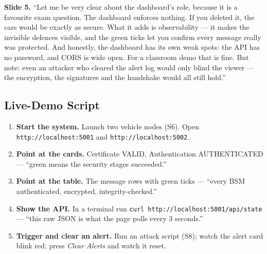 \documentclass[11pt,a4paper]{report}
\begin{document}
\textbf{Slide 5.} ``Let me be very clear about the dashboard's role, because it
is a favourite exam question. The dashboard enforces nothing. If you deleted it,
the cars would be exactly as secure. What it adds is observability --- it makes
the invisible defences visible, and the green ticks let you confirm every message
really was protected. And honestly, the dashboard has its own weak spots: the API
has no password, and CORS is wide open. For a classroom demo that is fine. But
note: even an attacker who cleared the alert log would only blind the viewer ---
the encryption, the signatures and the handshake would all still hold.''

\subsection{Live-Demo Script}
\begin{enumerate}
  \item \textbf{Start the system.} Launch two vehicle nodes (S6). Open
        \texttt{http://localhost:5001} and \texttt{http://localhost:5002}.
  \item \textbf{Point at the cards.} Certificate VALID, Authentication
        AUTHENTICATED --- ``green means the security stages succeeded.''
  \item \textbf{Point at the table.} The message rows with green ticks ---
        ``every BSM authenticated, encrypted, integrity-checked.''
  \item \textbf{Show the API.} In a terminal run \texttt{curl
        http://localhost:5001/api/state} --- ``this raw JSON is what the page
        polls every 3 seconds.''
  \item \textbf{Trigger and clear an alert.} Run an attack script (S8); watch the
        alert card blink red; press \emph{Clear Alerts} and watch it reset.
\end{enumerate}
\end{document}

